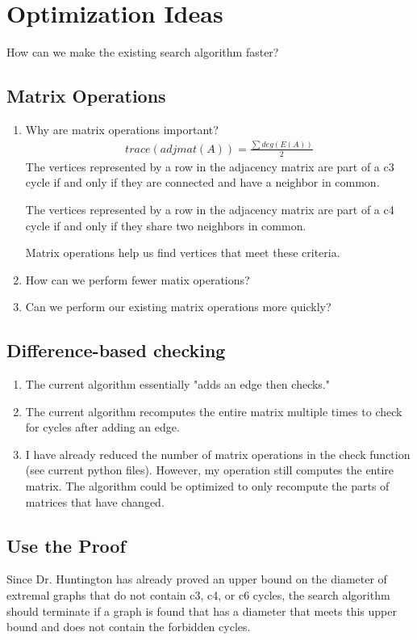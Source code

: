 \documentclass{article}
\begin{document}
\section{Optimization Ideas}
How can we make the existing search algorithm faster?
\subsection{Matrix Operations}

\begin{enumerate}
	\item Why are matrix operations important?
	\begin{gather*}
	trace(adjmat(A))=\frac{\sum deg(E(A))}{2}
	\end{gather*}
	The vertices represented by a row in the adjacency matrix are part of a c3 cycle if and only if they are connected and have a neighbor in common.
	
	The vertices represented by a row in the adjacency matrix are part of a c4 cycle if and only if they share two neighbors in common.
	
	Matrix operations help us find vertices that meet these criteria.
	\item How can we perform fewer matix operations?
	\item Can we perform our existing matrix operations more quickly?
\end{enumerate}

\subsection{Difference-based checking}
\begin{enumerate}
	\item The current algorithm essentially "adds an edge then checks."
	\item The current algorithm recomputes the entire matrix multiple times to check for cycles after adding an edge.
	\item I have already reduced the number of matrix operations in the check function (see current python files). However, my operation still computes the entire matrix. The algorithm could be optimized to only recompute the parts of matrices that have changed.
\end{enumerate}

\subsection{Use the Proof}
Since Dr. Huntington has already proved an upper bound on the diameter of extremal graphs that do not contain c3, c4, or c6 cycles, the search algorithm should terminate if a graph is found that has a diameter that meets this upper bound and does not contain the forbidden cycles.
\end{document}
